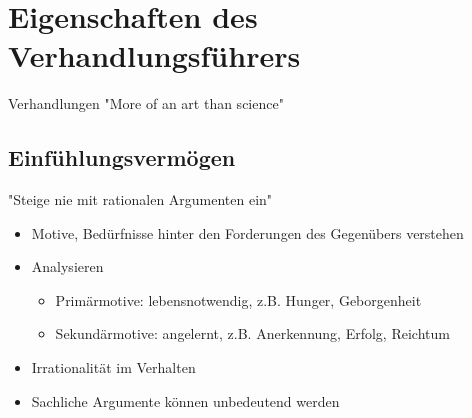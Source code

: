 

\section{Eigenschaften des Verhandlungsführers}


\begin{frame}{Verhandlungen}
  "More of an art than science" \cite[][p.12]{mccarthy_advanced_2015}


\end{frame}

\subsection{Einfühlungsvermögen}

\begin{frame}
  "Steige nie mit rationalen Argumenten ein" \cite{obermeier_karrieresprung_nodate}
\end{frame}

\begin{frame}
  \begin{itemize}
    \item Motive, Bedürfnisse hinter den Forderungen des Gegenübers verstehen \cites[][p. 106]{mccarthy_advanced_2015}{wannenwetsch_erfolgreicher_2009}
  \item Analysieren \cite[][ch. 4.4.2]{helmold_verhandlungskonzepte_2019} \begin{itemize}
	  \item Primärmotive: lebensnotwendig, z.B. Hunger, Geborgenheit
	  \item Sekundärmotive: angelernt, z.B. Anerkennung, Erfolg, Reichtum
	\end{itemize}
  \item Irrationalität im Verhalten \cite[][p. 12]{mccarthy_advanced_2015}
  \item Sachliche Argumente können unbedeutend werden 
  \end{itemize}
	  

\end{frame}



